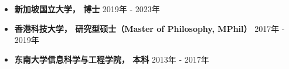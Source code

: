 \begin{itemize}
  \item \textbf{新加坡国立大学， 博士} \hfill 2019年 - 2023年
  \item \textbf{香港科技大学， 研究型硕士（Master of Philosophy, MPhil）} \hfill 2017年 - 2019年
  \item \textbf{东南大学信息科学与工程学院， 本科} \hfill 2013年 - 2017年
\end{itemize}
